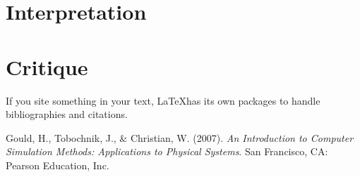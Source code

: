 \documentclass{article}%
\begin{document}
\section{Interpretation}

\section{Critique}
If you site something in your text, \LaTeX has its own packages to handle bibliographies and citations.

\begin{thebibliography}{1}
	Gould, H., Tobochnik, J., \& Christian, W. (2007). \textit{An Introduction to Computer Simulation Methods: Applications to Physical Systems}. San Francisco, CA: Pearson Education, Inc.
\end{thebibliography} 
\end{document}
